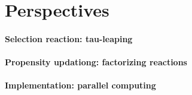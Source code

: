 \section {Perspectives}

\paragraph{Selection reaction: tau-leaping}

\paragraph{Propensity updationg: factorizing reactions}

\paragraph {Implementation: parallel computing}
